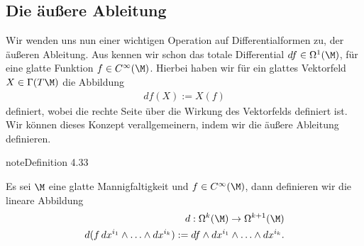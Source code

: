 \documentclass[letterpaper,10pt,english]{jupyterBook}
\begin{document}
\subsection{Die äußere Ableitung}
\label{\detokenize{manifolds/diffformen:die-auszere-ableitung}}
\sphinxAtStartPar
Wir wenden uns nun einer wichtigen Operation auf Differentialformen zu, der äußeren Ableitung. Aus {\hyperref[\detokenize{manifolds/tangential:ex:totdiff}]{}} kennen wir schon das totale Differential \(df\in \Omega^1(\M)\), für eine glatte Funktion \(f\in C^\infty(\M)\). Hierbei haben wir für ein glattes Vektorfeld \(X\in \Gamma(T\M)\) die Abbildung
\begin{equation*}
\begin{split}df(X) := X(f)\end{split}
\end{equation*}
\sphinxAtStartPar
definiert, wobei die rechte Seite über die Wirkung des Vektorfelds definiert ist. Wir können dieses Konzept verallgemeinern, indem wir die äußere Ableitung definieren.
\label{manifolds/diffformen:definition-5}
\begin{sphinxadmonition}{note}{Definition 4.33}



\sphinxAtStartPar
Es sei \(\M\) eine glatte Mannigfaltigkeit und \(f\in C^\infty(\M)\), dann definieren wir die lineare Abbildung
\begin{equation*}
\begin{split}d:\Omega^k(\M)\to \Omega^{k+1}(\M)\\
d(f\, dx^{i_1}\wedge\ldots\wedge dx^{i_k}):= df \wedge dx^{i_1}\wedge\ldots\wedge dx^{i_k}.\end{split}
\end{equation*}\end{sphinxadmonition}
\label{manifolds/diffformen:remark-6}
\end{document}
